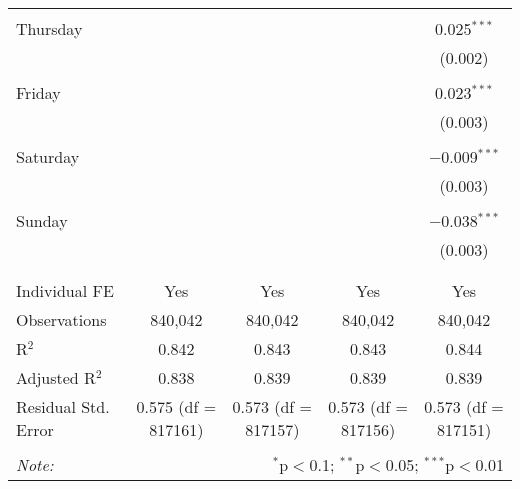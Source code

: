 \documentclass[
]{article}
\begin{document}
\begin{table}[!htbp]
{\begin{tabular}{@{\extracolsep{5pt}}lcccc}
  & & & & \\ 
 Thursday &  &  &  & 0.025$^{***}$ \\ 
  &  &  &  & (0.002) \\ 
  & & & & \\ 
 Friday &  &  &  & 0.023$^{***}$ \\ 
  &  &  &  & (0.003) \\ 
  & & & & \\ 
 Saturday &  &  &  & $-$0.009$^{***}$ \\ 
  &  &  &  & (0.003) \\ 
  & & & & \\ 
 Sunday &  &  &  & $-$0.038$^{***}$ \\ 
  &  &  &  & (0.003) \\ 
  & & & & \\ 
\hline \\[-1.8ex] 
Individual FE & Yes & Yes & Yes & Yes \\ 
Observations & 840,042 & 840,042 & 840,042 & 840,042 \\ 
R$^{2}$ & 0.842 & 0.843 & 0.843 & 0.844 \\ 
Adjusted R$^{2}$ & 0.838 & 0.839 & 0.839 & 0.839 \\ 
Residual Std. Error & 0.575 (df = 817161) & 0.573 (df = 817157) & 0.573 (df = 817156) & 0.573 (df = 817151) \\ 
\hline 
\hline \\[-1.8ex] 
\textit{Note:}  & \multicolumn{4}{r}{$^{*}$p$<$0.1; $^{**}$p$<$0.05; $^{***}$p$<$0.01} \\ 
\end{tabular}
} 
\end{table} 
\newpage
\end{document}
